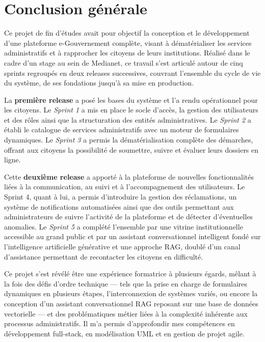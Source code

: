 \chapter*{Conclusion générale}

Ce projet de fin d'études avait pour objectif la conception et le développement d'une plateforme e-Gouvernement complète, visant à dématérialiser les services administratifs et à rapprocher les citoyens de leurs institutions. Réalisé dans le cadre d'un stage au sein de Medianet, ce travail s'est articulé autour de cinq sprints regroupés en deux releases successives, couvrant l'ensemble du cycle de vie du système, de ses fondations jusqu'à sa mise en production.

La \textbf{première release} a posé les bases du système et l'a rendu opérationnel pour les citoyens. Le \textit{Sprint 1} a mis en place le socle d'accès, la gestion des utilisateurs et des rôles ainsi que la structuration des entités administratives. Le \textit{Sprint 2} a établi le catalogue de services administratifs avec un moteur de formulaires dynamiques. Le \textit{Sprint 3} a permis la dématérialisation complète des démarches, offrant aux citoyens la possibilité de soumettre, suivre et évaluer leurs dossiers en ligne.

Cette \textbf{deuxième release} a apporté à la plateforme de nouvelles fonctionnalités liées à la communication, au suivi et à l'accompagnement des utilisateurs. Le Sprint 4, quant à lui, a permis d'introduire la gestion des réclamations, un système de notifications automatisées ainsi que des outils permettant aux administrateurs de suivre l'activité de la plateforme et de détecter d'éventuelles anomalies. Le \textit{Sprint 5} a complété l'ensemble par une vitrine institutionnelle accessible au grand public et par un assistant conversationnel intelligent fondé sur l'intelligence artificielle générative et une approche RAG, doublé d'un canal d'assistance permettant de recontacter les citoyens en difficulté.

Ce projet s'est révélé être une expérience formatrice à plusieurs égards, mêlant à la fois des défis d'ordre technique — tels que la prise en charge de formulaires dynamiques en plusieurs étapes, l'interconnexion de systèmes variés, ou encore la conception d'un assistant conversationnel RAG reposant sur une base de données vectorielle — et des problématiques métier liées à la complexité inhérente aux processus administratifs. Il m'a permis d'approfondir mes compétences en développement full-stack, en modélisation UML et en gestion de projet agile.



